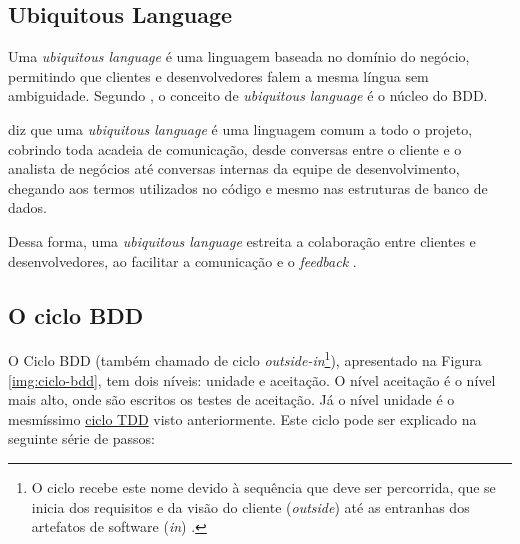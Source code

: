 
\subsection{Ubiquitous Language} %
\label{sub:ubiquitous_language}

Uma \textit{ubiquitous language} é uma linguagem baseada no domínio do negócio, permitindo que clientes e desenvolvedores falem a mesma língua sem ambiguidade. Segundo , o conceito de \textit{ubiquitous language} é o núcleo do BDD.


 diz que uma \textit{ubiquitous language} é uma linguagem comum a todo o projeto, cobrindo toda acadeia de comunicação, desde conversas entre o cliente e o analista de negócios até conversas internas da equipe de desenvolvimento, chegando aos termos utilizados no código e mesmo nas estruturas de banco de dados.

Dessa forma, uma \textit{ubiquitous language} estreita a colaboração entre clientes e desenvolvedores, ao facilitar a comunicação e o \textit{feedback} \cite{DDD}.


\subsection{O ciclo BDD}
\label{sub:o_ciclo_bdd}

O Ciclo BDD (também chamado de ciclo \textit{outside-in}\footnote{O ciclo recebe este nome devido à sequência que deve ser percorrida, que se inicia dos requisitos e da visão do cliente (\textit{outside}) até as entranhas dos artefatos de software (\textit{in}) \cite{BDDRodrigo}.}), apresentado na Figura \ref{img:ciclo-bdd}, tem dois níveis: unidade e aceitação. O nível aceitação é o nível mais alto, onde são escritos os testes de aceitação. Já o nível unidade é o mesmíssimo \hyperref[ssub:ciclo_tdd]{ciclo TDD} visto anteriormente. Este ciclo pode ser explicado na seguinte série de passos:

